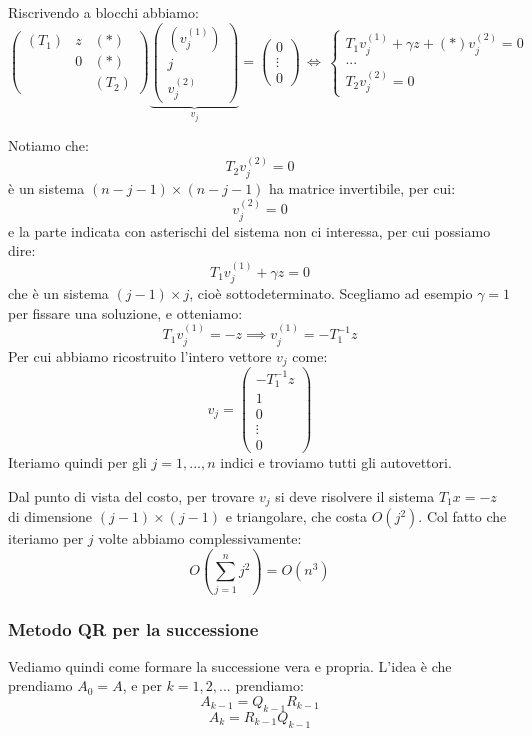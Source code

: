 \documentclass[a4paper,11pt]{article}
\begin{document}
Riscrivendo a blocchi abbiamo:
$$
\begin{pmatrix}
	(T_1) & z & (*) \\ 
				& 0 & (*)  \\ 
				& & (T_2)
\end{pmatrix}
\underbrace{
\begin{pmatrix}
	(v_j^{(1)}) \\ j \\ v_{j}^{(2)} 
\end{pmatrix}
}_{v_j}
=
\begin{pmatrix}
	0 \\ \vdots \\ 0
\end{pmatrix}
\, \Leftrightarrow \,
\begin{cases}
	T_1 v_j^{(1)} + \gamma z + (*) v_j^{(2)} = 0 \\ 
	... \\ 
	T_2 v_j^{(2)} = 0
\end{cases}
$$

Notiamo che:
$$
T_2 v_j^{(2)} = 0
$$
è un sistema $(n - j - 1) \times (n - j - 1)$ ha matrice invertibile, per cui:
$$
v_j^{(2)} = 0
$$
e la parte indicata con asterischi del sistema non ci interessa, per cui possiamo dire:
$$
T_1 v_j^{(1)} + \gamma z = 0
$$
che è un sistema $(j - 1) \times j$, cioè sottodeterminato.
Scegliamo ad esempio $\gamma = 1$ per fissare una soluzione, e otteniamo:
$$
T_1 v_j^{(1)} = -z \implies v_j^{(1)} = - T_1^{-1} z
$$
Per cui abbiamo ricostruito l'intero vettore $v_j$ come:
$$
v_j =
\begin{pmatrix}
	-T_1^{-1} z \\ 
	1 \\ 
	0 \\
	\vdots \\ 
	0
\end{pmatrix}
$$
Iteriamo quindi per gli $j = 1, ..., n$ indici e troviamo tutti gli autovettori.

Dal punto di vista del costo, per trovare $v_j $ si deve risolvere il sistema $T_1 x = -z$ di dimensione $(j - 1) \times (j - 1)$ e triangolare, che costa $O(j^2)$.
Col fatto che iteriamo per $j$ volte abbiamo complessivamente:
$$
O\left( \sum_{j = 1}^n j^2 \right) = O(n^3)
$$

\subsubsection{Metodo QR per la successione}
Vediamo quindi come formare la successione vera e propria.
L'idea è che prendiamo $A_0 = A$, e per $k = 1, 2, ...$ prendiamo:
$$
A_{k - 1} = Q_{k - 1} R_{k - 1}
$$
$$
A_k = R_{k - 1} Q_{k - 1}
$$
\end{document}
